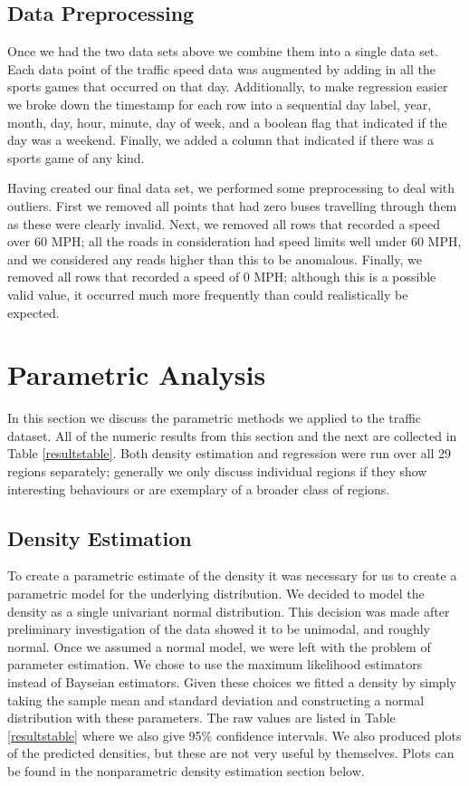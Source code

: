 \documentclass[12pt]{article}
\begin{document}
\subsection{Data Preprocessing}
Once we had the two data sets above we combine them into a single data set. Each data point of the traffic speed data was augmented by adding in all the sports games that occurred on that day. Additionally, to make regression easier we broke down the timestamp for each row into a sequential day label, year, month, day, hour, minute, day of week, and a boolean flag that indicated if the day was a weekend. Finally, we added a column that indicated if there was a sports game of any kind.

Having created our final data set, we performed some preprocessing to deal with outliers. First we removed all points that had zero buses travelling through them as these were clearly invalid. Next, we removed all rows that recorded a speed over 60 MPH; all the roads in consideration had speed limits well under 60 MPH, and we considered any reads higher than this to be anomalous. Finally, we removed all rows that recorded a speed of 0 MPH; although this is a possible valid value, it occurred much more frequently than could realistically be expected.
\section{Parametric Analysis}
In this section we discuss the parametric methods we applied to the traffic dataset. All of the numeric results from this section and the next are collected in Table \ref{resultstable}. Both density estimation and regression were run over all 29 regions separately; generally we only discuss individual regions if they show interesting behaviours or are exemplary of a broader class of regions.
\subsection{Density Estimation}
To create a parametric estimate of the density it was necessary for us to create a parametric model for the underlying distribution. We decided to model the density as a single univariant normal distribution. This decision was made after preliminary investigation of the data showed it to be unimodal, and roughly normal. Once we assumed a normal model, we were left with the problem of parameter estimation. We chose to use the maximum likelihood estimators instead of Bayseian estimators. Given these choices we fitted a density by simply taking the sample mean and standard deviation and constructing a normal distribution with these parameters. The raw values are listed in Table \ref{resultstable} where we also give 95\% confidence intervals. We also produced plots of the predicted densities, but these are not very useful by themselves. Plots can be found in the nonparametric density estimation section below.
\end{document}
